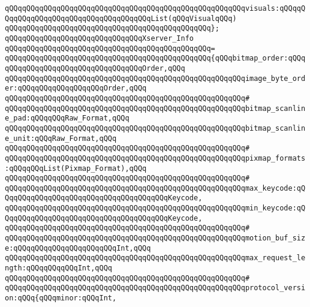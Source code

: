 \verb|qQQqqQQqqQQqqQQqqQQqqQQqqQQqqQQqqQQqqQQqqQQqqQQqqQQqqQQqvisuals:qQQqqQQqqQQqqQQqqQQqqQQqqQQqqQQqqQQqqQQqList(qQQqVisualqQQq)|\newline
\verb|qQQqqQQqqQQqqQQqqQQqqQQqqQQqqQQqqQQqqQQqqQQqqQQq};|\newline
\newline
\verb|qQQqqQQqqQQqqQQqqQQqqQQqqQQqqQQqXserver_Info|\newline
\verb|qQQqqQQqqQQqqQQqqQQqqQQqqQQqqQQqqQQqqQQqqQQqqQQq=|\newline
\verb|qQQqqQQqqQQqqQQqqQQqqQQqqQQqqQQqqQQqqQQqqQQqqQQq{qQQqbitmap_order:qQQqqQQqqQQqqQQqqQQqqQQqqQQqqQQqqQQqOrder,qQQq|\newline
\verb|qQQqqQQqqQQqqQQqqQQqqQQqqQQqqQQqqQQqqQQqqQQqqQQqqQQqqQQqimage_byte_order:qQQqqQQqqQQqqQQqqQQqOrder,qQQq|\newline
\verb|qQQqqQQqqQQqqQQqqQQqqQQqqQQqqQQqqQQqqQQqqQQqqQQqqQQqqQQq#|\newline
\verb|qQQqqQQqqQQqqQQqqQQqqQQqqQQqqQQqqQQqqQQqqQQqqQQqqQQqqQQqbitmap_scanline_pad:qQQqqQQqRaw_Format,qQQq|\newline
\verb|qQQqqQQqqQQqqQQqqQQqqQQqqQQqqQQqqQQqqQQqqQQqqQQqqQQqqQQqbitmap_scanline_unit:qQQqRaw_Format,qQQq|\newline
\verb|qQQqqQQqqQQqqQQqqQQqqQQqqQQqqQQqqQQqqQQqqQQqqQQqqQQqqQQq#|\newline
\verb|qQQqqQQqqQQqqQQqqQQqqQQqqQQqqQQqqQQqqQQqqQQqqQQqqQQqqQQqpixmap_formats:qQQqqQQqList(Pixmap_Format),qQQq|\newline
\verb|qQQqqQQqqQQqqQQqqQQqqQQqqQQqqQQqqQQqqQQqqQQqqQQqqQQqqQQq#|\newline
\verb|qQQqqQQqqQQqqQQqqQQqqQQqqQQqqQQqqQQqqQQqqQQqqQQqqQQqqQQqmax_keycode:qQQqqQQqqQQqqQQqqQQqqQQqqQQqqQQqqQQqqQQqKeycode,|\newline
\verb|qQQqqQQqqQQqqQQqqQQqqQQqqQQqqQQqqQQqqQQqqQQqqQQqqQQqqQQqmin_keycode:qQQqqQQqqQQqqQQqqQQqqQQqqQQqqQQqqQQqqQQqKeycode,|\newline
\verb|qQQqqQQqqQQqqQQqqQQqqQQqqQQqqQQqqQQqqQQqqQQqqQQqqQQqqQQq#|\newline
\verb|qQQqqQQqqQQqqQQqqQQqqQQqqQQqqQQqqQQqqQQqqQQqqQQqqQQqqQQqmotion_buf_size:qQQqqQQqqQQqqQQqqQQqqQQqInt,qQQq|\newline
\verb|qQQqqQQqqQQqqQQqqQQqqQQqqQQqqQQqqQQqqQQqqQQqqQQqqQQqqQQqmax_request_length:qQQqqQQqqQQqInt,qQQq|\newline
\verb|qQQqqQQqqQQqqQQqqQQqqQQqqQQqqQQqqQQqqQQqqQQqqQQqqQQqqQQq#|\newline
\verb|qQQqqQQqqQQqqQQqqQQqqQQqqQQqqQQqqQQqqQQqqQQqqQQqqQQqqQQqprotocol_version:qQQq{qQQqminor:qQQqInt,|\newline
